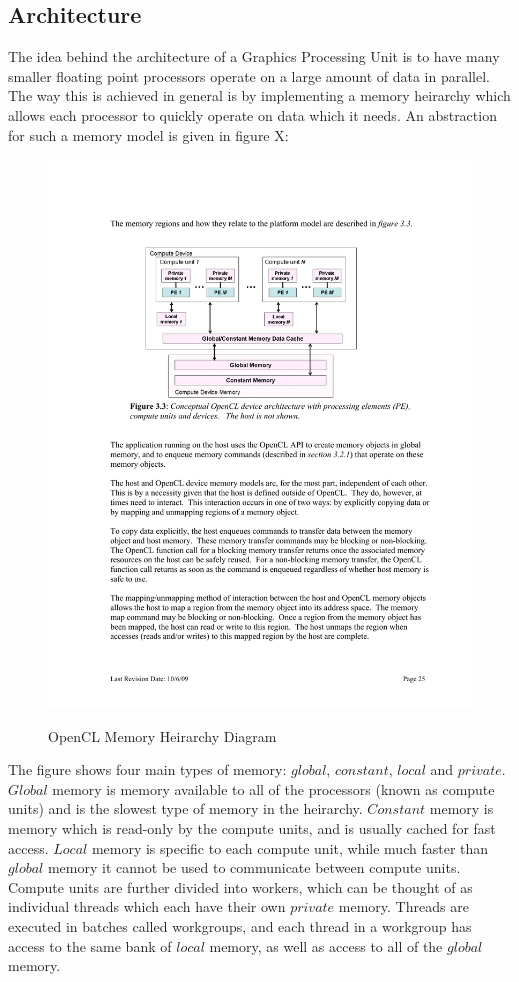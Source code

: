\subsection{Architecture}
The idea behind the architecture of a Graphics Processing Unit is to have many
smaller floating point processors operate on a large amount of data in
parallel.
The way this is achieved in general is by implementing a memory heirarchy which
allows each processor to quickly operate on data which it needs. An abstraction for such a memory model is given in figure X:

\begin{figure}[!htc]
 		\centering
		\includegraphics[scale=1.0]{figures/gpu_memory.pdf}
		\label{fig:logic}
        \caption{ OpenCL Memory Heirarchy Diagram \cite{OpenCLSpec} }
\end{figure}

The figure shows four main types of memory: $global$, $constant$, $local$ and
$private$. $Global$ memory is memory available to all of the processors (known
as compute units) and is the slowest type of memory in the heirarchy.
$Constant$ memory is memory which is read-only by the compute units, and is
usually cached for fast access. $Local$ memory is specific to each compute
unit, while much faster than $global$ memory it cannot be used to communicate
between compute units. Compute units are further divided into workers, which
can be thought of as individual threads which each have their own $private$
memory. Threads are executed in batches called workgroups, and each thread in a
workgroup has access to the same bank of $local$ memory, as well as access to
all of the $global$ memory. 


